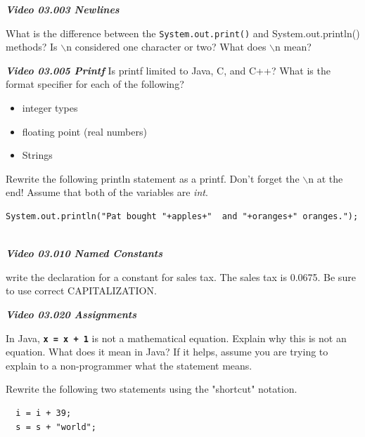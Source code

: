 \documentclass[letterpaper,11pt]{exam}
\newcommand{\videoheading}[1]{\Large\textbf{\textit{#1}}}
\begin{document}
\videoheading{Video 03.003 Newlines}

\begin{questions}
    \question What is the difference between the \texttt{System.out.print()} and System.out.println() methods?
   \question Is $\backslash$n considered one character or two? 
   \question What does $\backslash$n mean?
   
   \videoheading{{Video 03.005 Printf}}
   \question Is printf limited to Java, C, and C++?
   \question What is the format specifier for each of the following?
   \begin{itemize}
    \item integer types
    \item floating point (real numbers)
    \item Strings
   \end{itemize}
   \begin{samepage}
   \question Rewrite the following println statement as a printf.  Don't forget the $\backslash$n at the end!  Assume that both of the variables are \textit{int}.

   \begin{verbatim}
System.out.println("Pat bought "+apples+"  and "+oranges+" oranges.");
  

\end{verbatim}
  \end{samepage}

  \videoheading{{Video 03.010 Named Constants}}

  \question write the declaration for a constant for sales tax.  The sales tax is 0.0675.  Be sure to use correct CAPITALIZATION.
\vspace*{1.0cm}

  \videoheading{Video 03.020 Assignments}

  \question In Java, \texttt{\textbf{x = x + 1}} is not a mathematical equation.  Explain why this is not an equation.  What does it mean in Java?  If it helps, assume you are trying to explain to a non-programmer what the statement means.
  \vspace{2cm}

  \begin{samepage}
  \question Rewrite the following two statements using the "shortcut" notation.
\begin{verbatim}
  i = i + 39;
  s = s + "world";



\end{verbatim}
\end{samepage}


\end{questions}
\end{document}

